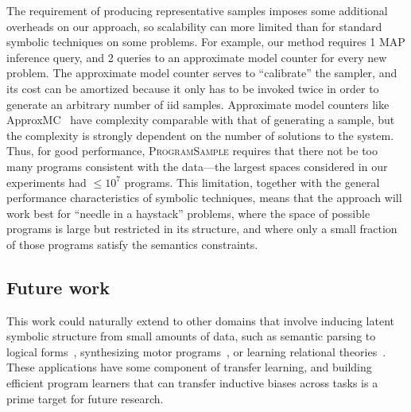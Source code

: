 \documentclass{article}
\newcommand{\theSystem}{\textsc{ProgramSample}}
\begin{document}
The requirement of producing representative samples imposes some
additional overheads on our approach, so scalability can more limited
than for standard symbolic techniques on some problems. For example,
our method requires 1 MAP inference query, and 2 queries to an
approximate model counter for every new problem. The approximate model
counter serves to ``calibrate'' the sampler, and its cost can be
amortized because it only has to be invoked twice in order to generate
an arbitrary number of iid samples. Approximate model counters like
ApproxMC~\cite{approximatemc} have complexity comparable with that of
generating a sample, but the complexity is strongly dependent on the
number of solutions to the system.  Thus, for good performance,
\theSystem{} requires that there not be too many programs consistent
with the data---the largest spaces considered in our experiments had
$\leq 10^7$ programs. This limitation, together with the general
performance characteristics of symbolic techniques, means that the
approach will work best for ``needle in a haystack'' problems, where
the space of possible programs is large but restricted in its
structure, and where only a small fraction of those programs satisfy
the semantics constraints.


\subsection{Future work}
This work could naturally extend to other domains that involve inducing latent symbolic structure from small amounts of data,
such as semantic parsing to logical forms~\cite{liang11dcs},
synthesizing motor programs~\cite{lake2015human},
or learning relational theories~\cite{logical}.
These applications have some component of transfer learning,
and building efficient program learners that can transfer inductive biases across tasks is a prime target for future research.


{\small }
\end{document}
